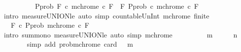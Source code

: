 \begin{isabellebody}
\ \ \isamarkupfalse%
\ {\isacharminus}{\kern0pt}\isanewline
\ \ \ \ \isamarkupfalse%
\ {\isachardoublequoteopen}P{\isachardot}{\kern0pt}prob\ {\isacharparenleft}{\kern0pt}{\isasymUnion}F{\isasymin}{\isasymF}{\isachardot}{\kern0pt}\ {\isasymUnion}c{\isacharless}{\kern0pt}{}{\isachardot}{\kern0pt}\ mchrome\ c\ F{\isacharparenright}{\kern0pt}\ {\isasymle}\ {\isacharparenleft}{\kern0pt}{\isasymSum}F{\isasymin}{\isasymF}{\isachardot}{\kern0pt}\ P{\isachardot}{\kern0pt}prob\ {\isacharparenleft}{\kern0pt}{\isasymUnion}c{\isacharless}{\kern0pt}{}{\isachardot}{\kern0pt}\ mchrome\ c\ F{\isacharparenright}{\kern0pt}{\isacharparenright}{\kern0pt}{\isachardoublequoteclose}\isanewline
\ \ \ \ \ \ \isamarkupfalse%
\ {\isacharparenleft}{\kern0pt}intro\ measure{\isacharunderscore}{\kern0pt}UNION{\isacharunderscore}{\kern0pt}le{\isacharparenright}{\kern0pt}\ {\isacharparenleft}{\kern0pt}auto\ simp{\isacharcolon}{\kern0pt}\ countable{\isacharunderscore}{\kern0pt}Un{\isacharunderscore}{\kern0pt}Int\ mchrome\ {\isacartoucheopen}finite\ {\isasymF}{\isacartoucheclose}{\isacharparenright}{\kern0pt}\isanewline
\ \ \ \ \isamarkupfalse%
\ \isamarkupfalse%
\ {\isachardoublequoteopen}{\isasymdots}\ {\isasymle}\ {\isacharparenleft}{\kern0pt}{\isasymSum}F{\isasymin}{\isasymF}{\isachardot}{\kern0pt}\ {\isasymSum}c{\isacharless}{\kern0pt}{}{\isachardot}{\kern0pt}\ P{\isachardot}{\kern0pt}prob\ {\isacharparenleft}{\kern0pt}mchrome\ c\ F{\isacharparenright}{\kern0pt}{\isacharparenright}{\kern0pt}{\isachardoublequoteclose}\isanewline
\ \ \ \ \ \ \isamarkupfalse%
\ {\isacharparenleft}{\kern0pt}intro\ sum{\isacharunderscore}{\kern0pt}mono\ measure{\isacharunderscore}{\kern0pt}UNION{\isacharunderscore}{\kern0pt}le{\isacharparenright}{\kern0pt}\ {\isacharparenleft}{\kern0pt}auto\ simp{\isacharcolon}{\kern0pt}\ mchrome{\isacharparenright}{\kern0pt}\isanewline
\ \ \ \ \isamarkupfalse%
\ \isamarkupfalse%
\ {\isachardoublequoteopen}{\isasymdots}\ {\isacharequal}{\kern0pt}\ m\ {\isacharasterisk}{\kern0pt}\ {}\ {\isacharasterisk}{\kern0pt}\ {\isacharparenleft}{\kern0pt}{}\ {\isacharslash}{\kern0pt}\ {}{\isacharcircum}{\kern0pt}n{\isacharparenright}{\kern0pt}{\isachardoublequoteclose}\isanewline
\ \ \ \ \ \ \isamarkupfalse%
\ {\isacharparenleft}{\kern0pt}simp\ add{\isacharcolon}{\kern0pt}\ prob{\isacharunderscore}{\kern0pt}mchrome\ {\isacartoucheopen}card\ {\isasymF}\ {\isacharequal}{\kern0pt}\ m{\isacartoucheclose}{\isacharparenright}{\kern0pt}\isanewline

\end{isabellebody}
